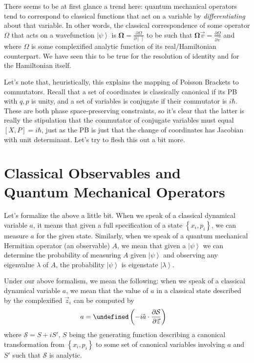 \documentclass[12pt]{report}
\newcommand{\ket}[1]{\left|#1\right>}
\newcommand{\pd}[2]{\frac{\partial#1}{\partial#2}}
\let\Re\undefined
\DeclareMathOperator{\Re}{Re}
\begin{document}
There seems to be at first glance a trend here: quantum mechanical operators
tend to correspond to classical functions that act on a variable by
\emph{differentiating} about that variable. In other words, the classical
correspondence of some operator $\Omega$ that acts on a wavefunction
$\ket{\psi}$ is $\mathbf{\Omega} = \pd{\Omega}{[~]}$ to be such that
$\mathbf{\Omega}\vec{v} = \pd{\Omega}{\vec{v}}$ and where $\Omega$ is some
complexified analytic function of its real/Hamiltonian counterpart. We have seen
this to be true for the resolution of identity and for the Hamiltonian itself.

Let's note that, heuristically, this explains the mapping of Poisson Brackets
to commutators. Recall that a set of coordinates is classically canonical if its
PB with $q,p$ is unity, and a set of variables is conjugate if their commutator
is $i\hbar$. These are both phase space-preserving constraints, so it's clear
that the latter is really the stipulation that the commutator of conjugate
variables must equal $\left[ X,P \right] = i\hbar$, just as the PB is just that
the change of coordinates has Jacobian with unit determinant. Let's try to flesh
this out a bit more.

\section{Classical Observables and Quantum Mechanical Operators}

Let's formalize the above a little bit. When we speak of a classical dynamical
variable $a$, it means that given a full specification of a state $\left\{ x_i,
p_i\right\}$, we can measure $a$ for the given state. Similarly, when we speak
of a quantum mechanical Hermitian operator (an observable) $A$, we mean that
given a $\ket{\psi}$ we can determine the probability of measuring $A$ given
$\ket{\psi}$ and observing any eigenvalue $\lambda$ of $A$, the probability
$\ket{\psi}$ is eigenstate $\ket{\lambda}$.

Under our above formalism, we mean the following: when we speak of a classical
dynamical variable $a$, we mean that the value of $a$ in a classical state
described by the complexified $\vec{z}_i$ can be computed by
\begin{align}
    a &= \Re\left(-i\hat{a}\cdot \pd{\mathcal{S}}{\vec{z}}\right)
\end{align}
where $\mathcal{S} = S + iS'$, $S$ being the generating function describing a
canonical transformation from $\left\{ x_i, p_i \right\}$ to some set of
canonical variables involving $a$ and $S'$ such that $\mathcal{S}$ is analytic.
\end{document}
